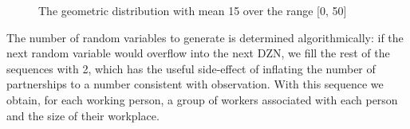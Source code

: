 \documentclass[a4paper,11pt]{scrreprt}
\begin{document}
\begin{figure}[!htbp]
\caption{The geometric distribution with mean 15 over the range [0, 50]}\label{fig:geom-distr}
\makebox[\textwidth]{
	
}
\end{figure}

The number of random variables to generate is determined algorithmically: if the next random variable
would overflow into the next DZN, we fill the rest of the sequences with 2, which has the useful 
side-effect of inflating the number of partnerships to a number consistent with observation.
With this sequence we obtain, for each working person, a group of workers associated with each person 
and the size of their workplace.
\end{document}
